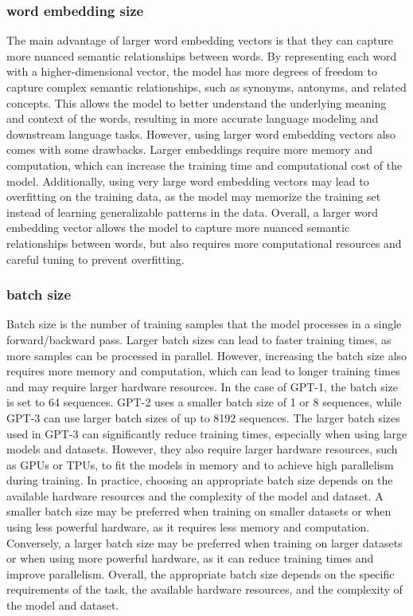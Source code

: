 \documentclass[
	11pt,
	a4paper,
	figtabcapt,
]{oblivoir}
\begin{document}
\subsubsection{word embedding size}
The main advantage of larger word embedding vectors is that they can capture more nuanced semantic relationships between words. By representing each word with a higher-dimensional vector, the model has more degrees of freedom to capture complex semantic relationships, such as synonyms, antonyms, and related concepts. This allows the model to better understand the underlying meaning and context of the words, resulting in more accurate language modeling and downstream language tasks.
However, using larger word embedding vectors also comes with some drawbacks. Larger embeddings require more memory and computation, which can increase the training time and computational cost of the model. Additionally, using very large word embedding vectors may lead to overfitting on the training data, as the model may memorize the training set instead of learning generalizable patterns in the data.
Overall, a larger word embedding vector allows the model to capture more nuanced semantic relationships between words, but also requires more computational resources and careful tuning to prevent overfitting.

\subsubsection{batch size}
Batch size is the number of training samples that the model processes in a single forward/backward pass. Larger batch sizes can lead to faster training times, as more samples can be processed in parallel. However, increasing the batch size also requires more memory and computation, which can lead to longer training times and may require larger hardware resources.
In the case of GPT-1, the batch size is set to 64 sequences. GPT-2 uses a smaller batch size of 1 or 8 sequences, while GPT-3 can use larger batch sizes of up to 8192 sequences. The larger batch sizes used in GPT-3 can significantly reduce training times, especially when using large models and datasets. However, they also require larger hardware resources, such as GPUs or TPUs, to fit the models in memory and to achieve high parallelism during training.
In practice, choosing an appropriate batch size depends on the available hardware resources and the complexity of the model and dataset. A smaller batch size may be preferred when training on smaller datasets or when using less powerful hardware, as it requires less memory and computation. Conversely, a larger batch size may be preferred when training on larger datasets or when using more powerful hardware, as it can reduce training times and improve parallelism.
Overall, the appropriate batch size depends on the specific requirements of the task, the available hardware resources, and the complexity of the model and dataset.
\end{document}
